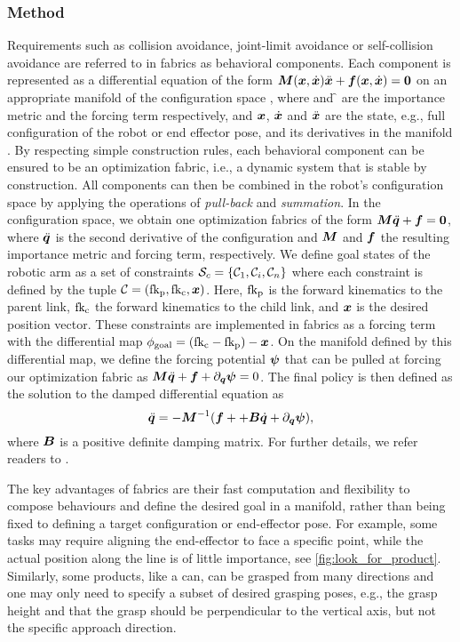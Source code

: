 \subsubsection{Method}
Requirements such as collision avoidance, joint-limit avoidance or self-collision avoidance are referred to in fabrics as behavioral components. Each component is represented as a differential equation of the form
$\bm{M}(\bm{x},\dot{\bm{x}})\ddot{\bm{x}}+\bm{f}(\bm{x},\dot{\bm{x}})=\bm{0}$ on an appropriate
manifold \X{} of the configuration space \Q{}, where \M{} and \f{} are the importance metric and the forcing term respectively, and $\bm{x}$, $\dot{\bm{x}}$ and $\ddot{\bm{x}}$ are the state, e.g., full configuration of the robot or end effector pose, and its derivatives in the manifold \X{}.
By respecting
simple construction rules, each behavioral component can be ensured to
be an optimization fabric, i.e., a dynamic system that is
stable by construction. All components can then be combined
in the robot's configuration space by applying the
operations of \textit{pull-back} and \textit{summation}. In
the configuration space, we obtain one optimization fabrics
of the form $\bm{M}\ddot{\bm{q}} + \bm{f} = \bm{0}$, where $\ddot{\bm{q}}$ is the second derivative of the configuration and $\bm{M}$ and $\bm{f}$ the resulting importance metric and forcing term, respectively.
We define goal states of the robotic arm as a set of
constraints $\mathcal{S}_c = \{\mathcal{C}_1,\mathcal{C}_i,\mathcal{C}_n\}$ where each
constraint \Con{} is defined by the tuple
$\mathcal{C}=(\textrm{fk}_{\textrm{p}},\textrm{fk}_{\textrm{c}},\bm{x})$. Here, $\textrm{fk}_{\textrm{p}}$ is the forward
kinematics to the parent link, $\textrm{fk}_{\textrm{c}}$ the forward
kinematics to the child link, and $\bm{x}$ is the desired position
vector. These constraints are implemented in \ac{fabrics} as a forcing term with the
differential map $\phi_{\textrm{goal}} = (\textrm{fk}_{\textrm{c}} - \textrm{fk}_{\textrm{p}}) -
\bm{x}$. On the manifold defined by this differential map, we
define the forcing potential $\bm{\psi}$ that can be pulled at
forcing our optimization fabric as
$\bm{M}\ddot{\bm{q}}+\bm{f}+\partial_{\bm{q}}\bm{\psi} = 0$.
The final policy is then defined as the solution to the
damped differential equation as
\begin{equation}
  \ddot{\bm{q}} = -\bm{M}^{-1}(\bm{f} + + \bm{B}\dot{\bm{q}} + \partial_{\bm{q}}\bm{\psi}),
  \label{eq:fabrics_policy}
\end{equation}
where $\bm{B}$ is a positive definite damping matrix.
For further details, we refer readers to \cite{Spahn2023}.

The key advantages of \ac{fabrics} are their fast computation and flexibility to
compose behaviours and define the desired goal in a manifold, rather than being
fixed to defining a target configuration or end-effector pose. For
example, some tasks may require aligning the end-effector
to face a specific point, while
the actual position along the line is of little importance, see
\cref{fig:look_for_product}.
Similarly, some products, like a can, can be grasped from many directions and one may only need to specify a subset of desired grasping poses, e.g., the grasp height and that the grasp should be perpendicular to the vertical axis, but not the specific approach direction.


